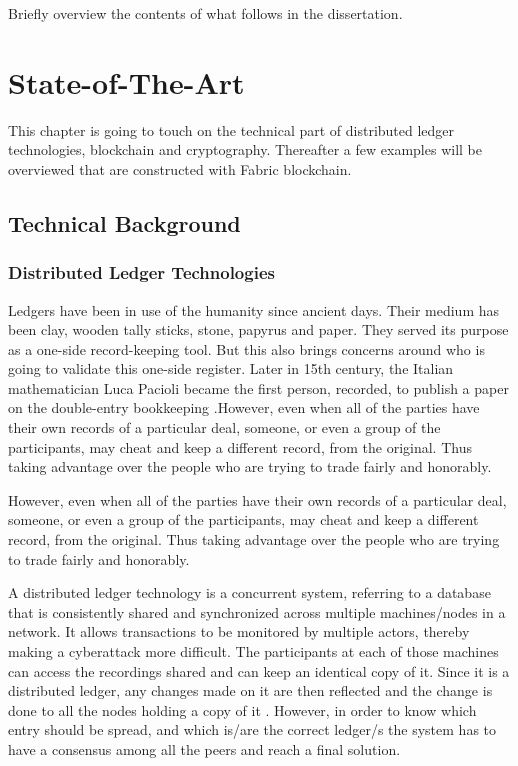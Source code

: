 \documentclass[a4paper,11pt]{report}
\begin{document}
Briefly overview the contents of what follows in the dissertation.



\chapter{State-of-The-Art}
\label{state}

This chapter is going to touch on the technical part of distributed ledger technologies, blockchain and cryptography. Thereafter a few examples will be overviewed that are constructed with Fabric blockchain. 
 
\section{Technical Background}
\subsection{Distributed Ledger Technologies}

\label{dlt}

Ledgers have been in use of the humanity since ancient days. Their medium has been clay, wooden tally sticks, stone, papyrus and paper. They served its purpose as a one-side record-keeping tool. But this also brings concerns around who is going to validate this one-side register. Later in 15th century, the Italian mathematician Luca Pacioli became the first person, recorded, to publish a paper on the double-entry bookkeeping \cite{ledgers}.However, even when all of the parties have their own records of a particular deal, someone, or even a group of the participants, may cheat and keep a different record, from the original. Thus taking advantage over the people who are trying to trade fairly and honorably.

However, even when all of the parties have their own records of a particular deal, someone, or even a group of the participants, may cheat and keep a different record, from the original. Thus taking advantage over the people who are trying to trade fairly and honorably.

A distributed ledger technology is a concurrent system, referring to a database that is consistently shared and synchronized across multiple machines/nodes in a network. It allows transactions to be monitored by multiple actors, thereby making a cyberattack more difficult. The participants at each of those machines can access the recordings shared and can keep an identical copy of it. Since it is a distributed ledger, any changes made on it are then reflected and the change is done to all the nodes holding a copy of it \cite{dltref} . However, in order to know which entry should be spread, and which is/are the correct ledger/s the system has to have a consensus among all the peers and reach a final solution.
\end{document}
